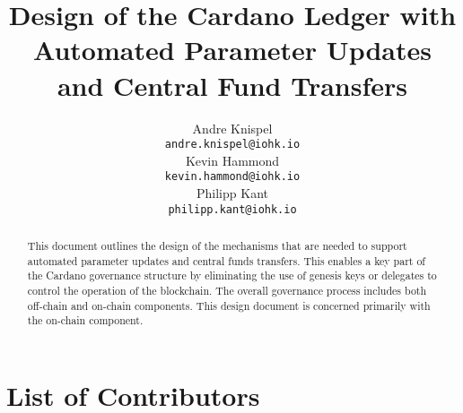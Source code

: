 

\cleardoublepage
\renewcommand{\thepage}{\arabic{page}}
\setcounter{page}{1}

\title{Design of the Cardano Ledger with Automated Parameter Updates and Central Fund Transfers}

\author{
   Andre Knispel \\ {\small \texttt{andre.knispel@iohk.io}} \\
   Kevin Hammond \\ {\small \texttt{kevin.hammond@iohk.io}} \\
   Philipp Kant \\ {\small \texttt{philipp.kant@iohk.io}} \\
   }

\date{}

\maketitle

\begin{abstract}
  This document outlines the design of the mechanisms that are needed to support
  automated parameter updates and central funds transfers.  This enables a key part of the Cardano governance structure by
  eliminating the use of genesis keys or delegates to control the operation of the blockchain.  The overall governance process includes both
  off-chain and on-chain components.  This design document is concerned primarily with the on-chain component.
\end{abstract}

\section*{List of Contributors}
\label{acknowledgements}

\begin{changelog}
\end{changelog}
